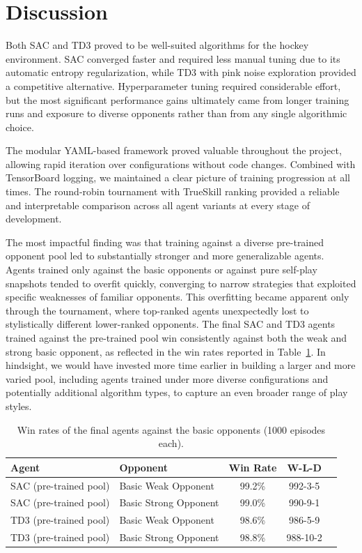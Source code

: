 \section{Discussion}
\label{sec:discussion}

Both \ac{SAC} and \ac{TD3} proved to be well-suited algorithms for the hockey environment. \ac{SAC} 
converged faster and required less manual tuning due to its automatic entropy 
regularization, while \ac{TD3} with pink noise exploration provided a competitive alternative. 
Hyperparameter tuning required considerable effort, but the most significant performance 
gains ultimately came from longer training runs and exposure to diverse opponents rather 
than from any single algorithmic choice.

The modular YAML-based framework proved valuable throughout the project, allowing rapid 
iteration over configurations without code changes. Combined with TensorBoard logging, 
we maintained a clear picture of training progression at all times. The round-robin 
tournament with TrueSkill ranking provided a reliable and interpretable comparison 
across all agent variants at every stage of development.

\medskip
The most impactful finding was that training against a diverse pre-trained opponent pool 
led to substantially stronger and more generalizable agents. Agents trained only against 
the basic opponents or against pure self-play snapshots tended to overfit quickly, 
converging to narrow strategies that exploited specific weaknesses of familiar opponents. 
This overfitting became apparent only through the tournament, where top-ranked agents 
unexpectedly lost to stylistically different lower-ranked opponents. The final \ac{SAC} and 
\ac{TD3} agents trained against the pre-trained pool win consistently against both the weak 
and strong basic opponent, as reflected in the win rates reported in 
Table~\ref{tab:win_rates}. In hindsight, we would have invested 
more time earlier in building a larger and more varied pool, including agents trained 
under more diverse configurations and potentially additional algorithm types, to capture 
an even broader range of play styles.

\begin{table}[h]
\centering
\caption{Win rates of the final agents against the basic opponents (1000 episodes each).}
\vspace{-0.2cm}
\label{tab:win_rates}
\begin{tabular}{llccc}
\toprule
\textbf{Agent} & \textbf{Opponent} &\textbf{Win Rate}  & \textbf{W-L-D} \\
\midrule
SAC (pre-trained pool)  & Basic Weak Opponent   & 99.2\% & 992-3-5   \\
SAC (pre-trained pool)  & Basic Strong Opponent & 99.0\% & 990-9-1   \\
TD3 (pre-trained pool)  & Basic Weak Opponent   & 98.6\% & 986-5-9   \\
TD3 (pre-trained pool)  & Basic Strong Opponent & 98.8\% & 988-10-2  \\
\bottomrule
\end{tabular}
\end{table}

